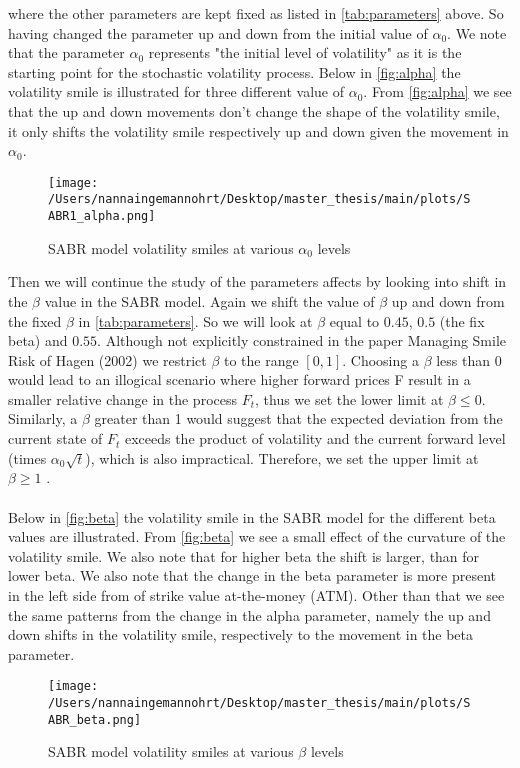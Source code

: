 where the other parameters are kept fixed as listed in \autoref{tab:parameters} above. So having changed the parameter
up and down from the initial value of $\alpha_0$.
We note that the parameter $\alpha_0$
represents "the initial level of volatility" as it is the starting point for the stochastic volatility process. 
Below in \autoref{fig:alpha} the volatility smile is illustrated for three different value of $\alpha_0$. 
From \autoref{fig:alpha} we see that the up and down movements don't change the shape of the volatility smile, 
it only shifts the volatility smile respectively up and down given the movement in $\alpha_0$.
\begin{figure}[H]
    \centering
    \texttt{[image: /Users/nannaingemannohrt/Desktop/master\_thesis/main/plots/SABR1\_alpha.png]}
    \caption{SABR model volatility smiles at various $\alpha_0$ levels}
    \label{fig:alpha}
\end{figure}
\noindent
Then we will continue the study of the parameters affects by looking into shift in the $\beta$ value in the SABR model.
Again we shift the value of $\beta$ up and down from the fixed $\beta$ in \autoref{tab:parameters}. So we will look at $\beta$ equal to $0.45$,
$0.5$ (the fix beta) and $0.55$. 
Although not explicitly constrained in the paper Managing Smile Risk 
of Hagen (2002) \cite{Smile} we restrict $\beta$ to the range $[0, 1]$. 
Choosing a $\beta$ less than 0 would lead to an illogical scenario where higher forward prices F result in a smaller 
relative change in the process $F_t$, thus we set the lower limit at $\beta \leq 0$. Similarly, a $\beta$ greater than 1 would 
suggest that the expected deviation from the current state of $F_t$ exceeds the product of volatility and the current 
forward level (times $\alpha_0 \sqrt{t}$), which is also impractical. Therefore, we set the upper limit at $\beta \geq 1$ \cite{Smile}.
\\\\
Below in \autoref{fig:beta} the volatility smile in the SABR model for the different beta values are illustrated.
From \autoref{fig:beta} we see a small effect of the curvature of the volatility smile. We also note that for higher 
beta the shift is larger, than for lower beta. We also note that the change in the beta parameter is more present in 
the left side from of strike value at-the-money (ATM). Other than that we see the same patterns from the change in 
the alpha parameter, namely the up and down shifts in the volatility smile, respectively to the movement in the 
beta parameter.
\begin{figure}[H]
    \centering
    \texttt{[image: /Users/nannaingemannohrt/Desktop/master\_thesis/main/plots/SABR\_beta.png]}
    \caption{SABR model volatility smiles at various $\beta$ levels}
    \label{fig:beta}
\end{figure}
